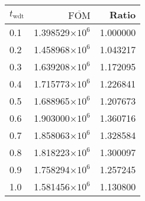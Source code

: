 \begin{tabular}{lrr}
\toprule
$t_{\mathrm{wdt}}$ & $\overline{\mathrm{FOM}}$ &    Ratio \\
\midrule
               0.1 &   1.398529$\times 10^{6}$ & 1.000000 \\
               0.2 &   1.458968$\times 10^{6}$ & 1.043217 \\
               0.3 &   1.639208$\times 10^{6}$ & 1.172095 \\
               0.4 &   1.715773$\times 10^{6}$ & 1.226841 \\
               0.5 &   1.688965$\times 10^{6}$ & 1.207673 \\
               0.6 &   1.903000$\times 10^{6}$ & 1.360716 \\
               0.7 &   1.858063$\times 10^{6}$ & 1.328584 \\
               0.8 &   1.818223$\times 10^{6}$ & 1.300097 \\
               0.9 &   1.758294$\times 10^{6}$ & 1.257245 \\
               1.0 &   1.581456$\times 10^{6}$ & 1.130800 \\
\bottomrule
\end{tabular}
